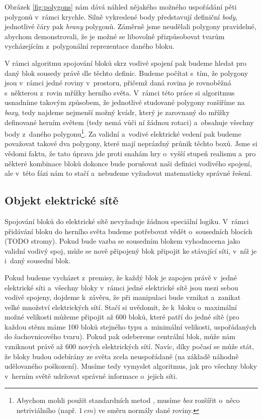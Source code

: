 \FloatBarrier

Obrázek \ref{fig:polygons} nám dává náhled nějakého možného uspořádání pěti polygonů v~rámci krychle. Silně vykreslené body představují definiční \textit{body}, jednotlivé čáry pak \textit{hrany} polygonů. Záměrně jsme neudělali polygony pravidelné, abychom demonstrovali, že je možné se libovolně přizpůsobovat tvarům vycházejícím z~polygonální reprezentace daného bloku.


V rámci algoritmu spojování bloků skrz vodivé spojení pak budeme hledat pro daný blok sousedy právě dle těchto definic. Budeme počítat s~tím, že polygony jsou v~rámci jedné roviny v~prostoru, přičemž daná rovina je rovnoběžná s~některou z~rovin mřížky herního světa. V~rámci této práce si algoritmus usnadníme takovým způsobem, že jednotlivé studované polygony rozšíříme na \textit{boxy}, tedy najdeme nejmenší možný kvádr, který je zarovnaný do mřížky definované herním světem (tedy nemá vůči ní žádnou rotaci) a~obsahuje všechny body z~daného polygonu\footnote{Abychom mohli použít standardních metod , musíme \textit{box} rozšířit o~něco netriviálního (např. $1~cm$) ve směru normály dané roviny.}. Za validní a~vodivé elektrické vedení pak budeme považovat takové dva polygony, které mají neprázdný průnik těchto boxů. Jsme si vědomi faktu, že tato úprava jde proti snahám hry o~vyšší stupeň realismu a~pro některé kombinace bloků dokonce bude porušovat naši definici vodivého spojení, ale v~této fázi nám to stačí a~nebudeme vyžadovat matematicky správné řešení.


\subsection{Objekt elektrické sítě}

Spojování bloků do elektrické sítě nevyžaduje žádnou speciální logiku. V~rámci přidávání bloku do herního světa budeme potřebovat vědět o~sousedních blocích (TODO stromy). Pokud bude vazba se sousedním blokem vyhodnocena jako validní vodivý spoj, může se nově připojený blok připojit ke stávající síti, v~níž je i~daný sousední blok.

Pokud budeme vycházet z~premisy, že každý blok je zapojen právě v~jedné elektrické síti a~všechny bloky v~rámci jedné elektrické sítě jsou mezi sebou vodivě spojeny, dojdeme k~závěru, že při manipulaci bude vznikat a~zanikat velké množství elektrických sítí. Stačí si uvědomit, že k~bloku  o~maximální možné velikosti můžeme připojit až 600 bloků, které patří do jedné sítě (pro každou stěnu máme 100 bloků stejného typu a~minimální velikosti, uspořádaných do šachovnicového tvaru). Pokud pak odebereme centrální blok, může nám vzniknout právě až 600 nových elektrických sítí. Navíc, díky počasí se může stát, že bloky budou odebírány ze světa zcela neuspořádaně (na základě náhodně udělovaného poškození). Musíme tedy vymyslet algoritmus, jak pro všechny bloky v~herním světě udržovat správné informace o~jejich síti.

